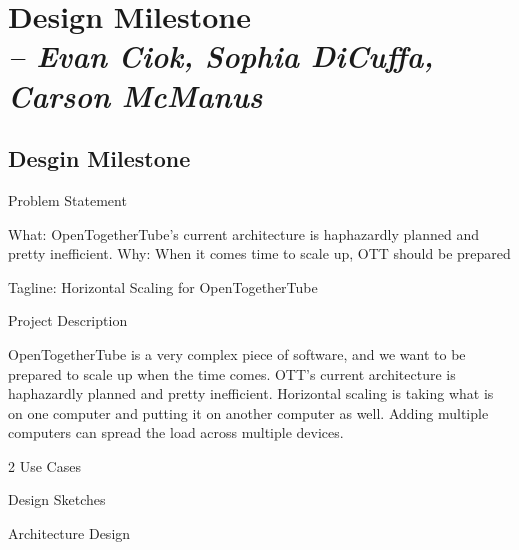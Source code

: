 \chapter{Design Milestone \\
  \small{\textit{-- Evan Ciok, Sophia DiCuffa, Carson McManus}}
  \label{Chapter::designMilestone}}

\section{Desgin Milestone \label{Section::designMilestone}}

Problem Statement

What: OpenTogetherTube’s current architecture is haphazardly planned and pretty inefficient.
Why:  When it comes time to scale up, OTT should be prepared 

Tagline: Horizontal Scaling for OpenTogetherTube

Project Description

OpenTogetherTube is a very complex piece of software, and we want to be prepared to scale up when the time comes. OTT's current architecture is haphazardly planned and pretty inefficient. 
Horizontal scaling is taking what is on one computer and putting it on another computer as well. Adding multiple computers can spread the load across multiple devices.


2 Use Cases


Design Sketches


Architecture Design

